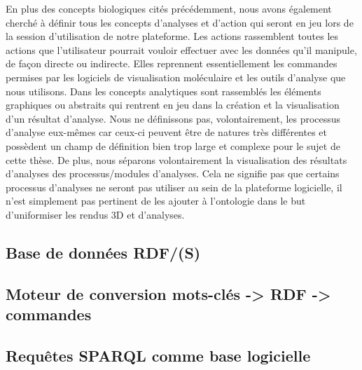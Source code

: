 En plus des concepts biologiques cités précédemment, nous avons également cherché à définir tous les concepts d'analyses et d'action qui seront en jeu lors de la session d'utilisation de notre plateforme. Les actions rassemblent toutes les actions que l'utilisateur pourrait vouloir effectuer avec les données qu'il manipule, de façon directe ou indirecte. Elles reprennent essentiellement les commandes permises par les logiciels de visualisation moléculaire et les outils d'analyse que nous utilisons. Dans les concepts analytiques sont rassemblés les éléments graphiques ou abstraits qui rentrent en jeu dans la création et la visualisation d'un résultat d'analyse. Nous ne définissons pas, volontairement, les processus d'analyse eux-mêmes car ceux-ci peuvent être de natures très différentes et possèdent un champ de définition bien trop large et complexe pour le sujet de cette thèse. De plus, nous séparons volontairement la visualisation des résultats d'analyses des processus/modules d'analyses. Cela ne signifie pas que certains processus d'analyses ne seront pas utiliser au sein de la plateforme logicielle, il n'est simplement pas pertinent de les ajouter à l'ontologie dans le but d'uniformiser les rendus 3D et d'analyses.

\subsection{Base de données RDF/(S)}

\subsection{Moteur de conversion mots-clés -> RDF -> commandes}

\subsection{Requêtes SPARQL comme base logicielle}





